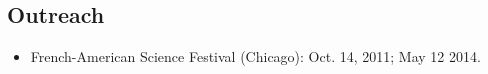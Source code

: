 \documentclass[a4paper,11pt]{article}
\begin{document}
\subsection*{Outreach}
\begin{itemize}
 \item French-American Science Festival (Chicago): Oct. 14, 2011; May 12 2014.
\end{itemize}





\renewcommand{\refname}{Publications with major contributions}
\end{document}
